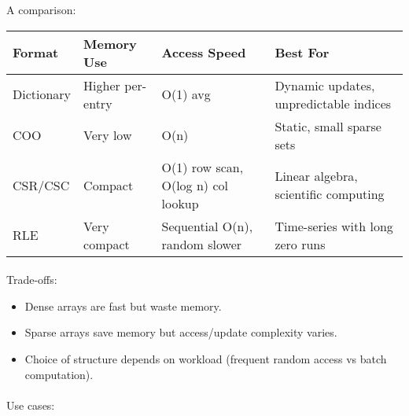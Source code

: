 \documentclass[
  letterpaper,
  DIV=11,
  numbers=noendperiod]{scrreprt}
\makeatletter
\let\oldparagraph\paragraph
\renewcommand{\paragraph}{
    \@ifstar
      \xxxParagraphStar
      \xxxParagraphNoStar
  }
\newcommand{\xxxParagraphStar}[1]{\oldparagraph*{#1}\mbox{}}
\newcommand{\xxxParagraphNoStar}[1]{\oldparagraph{#1}\mbox{}}
\providecommand{\tightlist}{%
  \setlength{\itemsep}{0pt}\setlength{\parskip}{0pt}}
\makeatother
\begin{document}
A comparison:

\begin{longtable}[]{@{}
  >{\raggedright\arraybackslash}p{}
  >{\raggedright\arraybackslash}p{}
  >{\raggedright\arraybackslash}p{}
  >{\raggedright\arraybackslash}p{}@{}}
\toprule\noalign{}
\begin{minipage}[b]{\linewidth}\raggedright
Format
\end{minipage} & \begin{minipage}[b]{\linewidth}\raggedright
Memory Use
\end{minipage} & \begin{minipage}[b]{\linewidth}\raggedright
Access Speed
\end{minipage} & \begin{minipage}[b]{\linewidth}\raggedright
Best For
\end{minipage} \\
\midrule\noalign{}
\endhead
\bottomrule\noalign{}
\endlastfoot
Dictionary & Higher per-entry & O(1) avg & Dynamic updates,
unpredictable indices \\
COO & Very low & O(n) & Static, small sparse sets \\
CSR/CSC & Compact & O(1) row scan, O(log n) col lookup & Linear algebra,
scientific computing \\
RLE & Very compact & Sequential O(n), random slower & Time-series with
long zero runs \\
\end{longtable}

\paragraph{Trade-offs:}\label{trade-offs}

\begin{itemize}
\tightlist
\item
  Dense arrays are fast but waste memory.
\item
  Sparse arrays save memory but access/update complexity varies.
\item
  Choice of structure depends on workload (frequent random access vs
  batch computation).
\end{itemize}

\paragraph{Use cases:}\label{use-cases}
\end{document}
